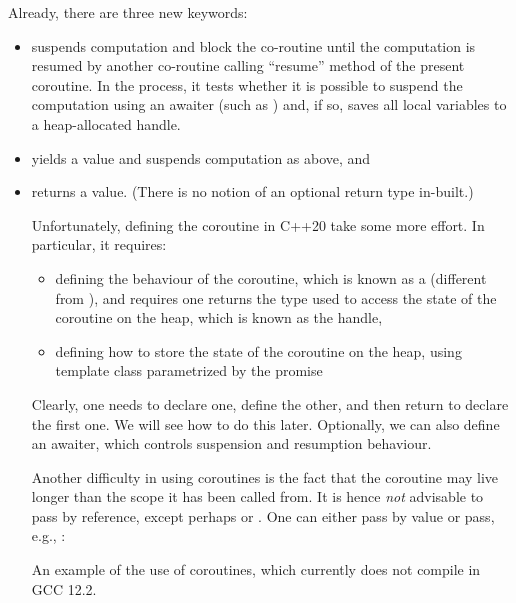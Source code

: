 Already, there are three new keywords:
\begin{itemize}
\item {} suspends computation and block the co-routine until the computation is resumed by another co-routine calling ``resume'' method of the present coroutine. In the process, it tests whether it is possible to suspend the computation using an awaiter (such as ) and, if so, saves all local variables to a heap-allocated handle.
\item {} yields a value and suspends computation as above, and  
\item {} returns a value. (There is no notion of an optional return type in-built.)
\begin{end}

Unfortunately, defining the coroutine in C++20 take some more effort. In particular, it requires:
\begin{itemize}
\item defining the behaviour of the coroutine, which is known as a  (different from ), and requires one returns the type used to access the state of the coroutine on the heap, which is known as the handle,  
\item defining how to store the state of the coroutine on the heap, using template class  parametrized by the promise
\end{itemize}
Clearly, one needs to declare one, define the other, and then return to declare the first one. We will see how to do this later.
Optionally, we can also define an awaiter, which controls suspension and resumption behaviour.

Another difficulty in using coroutines is the fact that the coroutine may live longer than the scope it has been called from. It is hence \emph{not} advisable to pass by reference, except perhaps  or . One can either pass by value or pass, e.g., :

\raggedbottom
\begin{codebox}[]{}{}
\footnotesize An example of the use of coroutines, which currently does not compile in GCC 12.2.
\tcblower
{}
\end{codebox}


\end{end}
\end{itemize}
